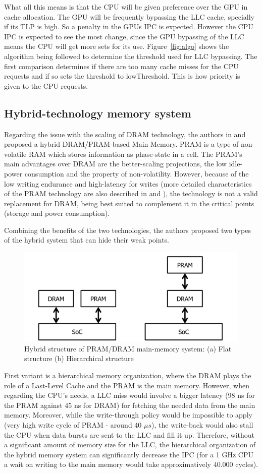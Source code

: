 \documentclass[journal]{IEEEtran}
\begin{document}
What all this means is that the CPU will be given preference over the GPU in cache allocation. The GPU will be frequently bypassing the LLC cache, specially if its TLP is high. So a penalty in the GPUs IPC is expected. However the CPU IPC is expected to see the most change, since the GPU bypassing of the LLC means the CPU will get more sets for its use. Figure~\ref{fig:algo} shows the algorithm being followed to determine the threshold used for LLC bypassing. The first comparison determines if there are too many cache misses for the CPU requests and if so sets the threshold to lowThreshold. This is how priority is given to the CPU requests.



\subsection{Hybrid-technology memory system}
Regarding the issue with the scaling of DRAM technology, the authors in \cite{PDRAM} and \cite{PRAM} proposed a hybrid DRAM/PRAM-based Main Memory. PRAM is a type of non-volatile RAM which stores information as phase-state in a cell. The PRAM’s main advantages over DRAM  are the better-scaling projections, the low idle-power consumption and the property of non-volatility. However, because of the low writing endurance and high-latency for writes (more detailed characteristics of the PRAM technology are also described in \cite{PDRAM} and \cite{PRAM}), the technology is not a valid replacement for DRAM, being best suited to complement it in the critical points (storage and power consumption).

Combining the benefits of the two technologies, the authors proposed two types of the hybrid system that can hide their weak points. 
\begin{figure}[H]
	\centering
	\includegraphics[width = 8 cm]{graphics/structure-hybrid.png}
	\caption{Hybrid structure of PRAM/DRAM main-memory system: (a) Flat structure (b) Hierarchical structure \cite{PRAM}}\label{fig:structure}
\end{figure} 
First variant is a hierarchical memory organization, where the DRAM plays the role of a Last-Level Cache and the PRAM is the main memory. However, when regarding the CPU’s needs, a LLC miss would involve a bigger latency (98 ns for the PRAM against 45 ns for DRAM) for fetching the needed data from the main memory. Moreover, while the write-through policy would be impossible to apply (very high write cycle of PRAM - around 40 $\mu s$), the write-back would also stall the CPU when data bursts are sent to the LLC and fill it up. Therefore, without a significant amount of memory size for the LLC, the hierarchical organization of the hybrid memory system can significantly decrease the IPC (for a 1 GHz CPU a wait on writing to the main memory would take approximatively 40.000 cycles).
\end{document}
